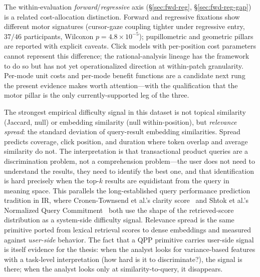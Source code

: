 \documentclass[10pt,twocolumn,letterpaper]{article}
\makeatletter
\renewcommand\subsection{\@startsection{subsection}{2}{\z@}{3pt}{1.5pt}{\normalfont\bfseries\small}}
\makeatother
\begin{document}
The within-evaluation \emph{forward}/\emph{regressive} axis (\S\ref{sec:fwd-reg}, \S\ref{sec:fwd-reg-gap}) is a related cost-allocation distinction. Forward and regressive fixations show different motor signatures (cursor-gaze coupling tighter under regressive entry, $37/46$ participants, Wilcoxon $p = 4.8 \times 10^{-5}$); pupillometric and geometric pillars are reported with explicit caveats. Click models with per-position cost parameters cannot represent this difference; the rational-analysis lineage has the framework to do so but has not yet operationalized direction at within-patch granularity. Per-mode unit costs and per-mode benefit functions are a candidate next rung the present evidence makes worth attention---with the qualification that the motor pillar is the only currently-supported leg of the three.

\subsection{Difficulty as discriminability}
The strongest empirical difficulty signal in this dataset is not topical similarity (Jaccard, null) or embedding similarity (null within-position), but \emph{relevance spread}: the standard deviation of query-result embedding similarities. Spread predicts coverage, click position, and duration where token overlap and average similarity do not. The interpretation is that transactional product queries are a discrimination problem, not a comprehension problem---the user does not need to understand the results, they need to identify the best one, and that identification is hard precisely when the top-$k$ results are equidistant from the query in meaning space. This parallels the long-established query performance prediction tradition in IR, where Cronen-Townsend et al.'s clarity score~\cite{cronentownsend2002clarity} and Shtok et al.'s Normalized Query Commitment~\cite{shtok2012nqc} both use the shape of the retrieved-score distribution as a system-side difficulty signal. Relevance spread is the same primitive ported from lexical retrieval scores to dense embeddings and measured against \emph{user-side} behavior. The fact that a QPP primitive carries user-side signal is itself evidence for the thesis: when the analyst looks for variance-based features with a task-level interpretation (how hard is it to discriminate?), the signal is there; when the analyst looks only at similarity-to-query, it disappears.
\end{document}

